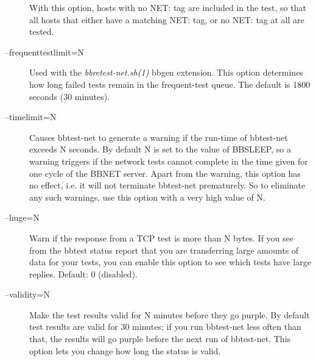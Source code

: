 \begin{description}
 With this option, hosts with no NET: tag are included in the test, so
 that all hosts that either have a matching NET: tag, or no NET: tag
 at all are tested. 

 

\item[--frequenttestlimit=N] Used with the \emph{bbretest-net.sh(1)}
 bbgen extension. This option determines how long failed tests remain
 in the frequent-test queue. The default is 1800 seconds (30
 minutes). 


 

\item[--timelimit=N] Causes bbtest-net to generate a warning if the
  run-time of bbtest-net exceeds N seconds. By default N is set to the
  value of BBSLEEP, so a warning triggers if the network tests cannot
  complete in the time given for one cycle of the BBNET server. Apart
  from the warning, this option has no effect, i.e. it will not
  terminate bbtest-net prematurely. So to eliminate any such warnings,
  use this option with a very high value of N. 



\item[--huge=N] Warn if the response from a TCP test is more than N
  bytes. If you see from the bbtest status report that you are
  transferring large amounts of data for your tests, you can enable
  this option to see which tests have large replies.   Default: 0
  (disabled). 


 

\item[--validity=N] Make the test results valid for N minutes before
  they go purple. By default test results are valid for 30 minutes; if
  you run bbtest-net less often than that, the results will go purple
  before the next run of bbtest-net. This option lets you change how
  long the status is valid. 


\end{description}

